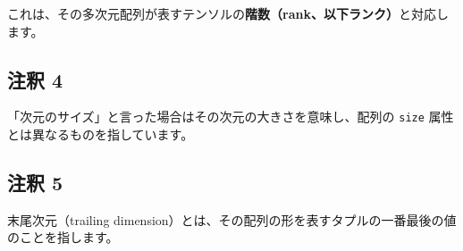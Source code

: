 これは、その多次元配列が表すテンソルの\textbf{階数（rank、以下ランク）}と対応します。


\subsection{注釈 4}
\label{03-reviewing-elementary-math-with-numpy-and-matplotlib-note4}


「次元のサイズ」と言った場合はその次元の大きさを意味し、配列の \texttt{size} 属性とは異なるものを指しています。


\subsection{注釈 5}
\label{03-reviewing-elementary-math-with-numpy-and-matplotlib-note5}


末尾次元（trailing dimension）とは、その配列の形を表すタプルの一番最後の値のことを指します。
